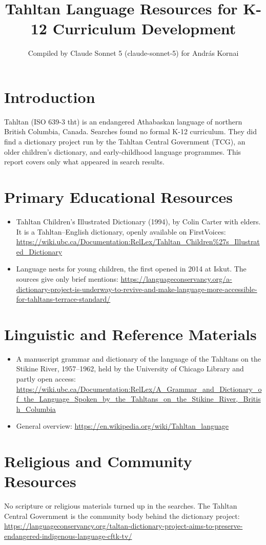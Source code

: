 \documentclass[12pt]{article}
\title{Tahltan Language Resources for K-12 Curriculum Development}
\author{Compiled by Claude Sonnet 5 (claude-sonnet-5) for Andr\'as Kornai}
\date{}
\begin{document}
\maketitle

\section{Introduction}
Tahltan (ISO 639-3 tht) is an endangered Athabaskan language of northern British Columbia, Canada. Searches found no formal K-12 curriculum. They did find a dictionary project run by the Tahltan Central Government (TCG), an older children's dictionary, and early-childhood language programmes. This report covers only what appeared in search results.

\section{Primary Educational Resources}
\begin{itemize}
\item Tahltan Children's Illustrated Dictionary (1994), by Colin Carter with elders. It is a Tahltan--English dictionary, openly available on FirstVoices: \url{https://wiki.ubc.ca/Documentation:RelLex/Tahltan_Children%27s_Illustrated_Dictionary}
\item Language nests for young children, the first opened in 2014 at Iskut. The sources give only brief mentions: \url{https://languageconservancy.org/a-dictionary-project-is-underway-to-revive-and-make-language-more-accessible-for-tahltans-terrace-standard/}
\end{itemize}

\section{Linguistic and Reference Materials}
\begin{itemize}
\item A manuscript grammar and dictionary of the language of the Tahltans on the Stikine River, 1957--1962, held by the University of Chicago Library and partly open access: \url{https://wiki.ubc.ca/Documentation:RelLex/A_Grammar_and_Dictionary_of_the_Language_Spoken_by_the_Tahltans_on_the_Stikine_River,_British_Columbia}
\item General overview: \url{https://en.wikipedia.org/wiki/Tahltan_language}
\end{itemize}

\section{Religious and Community Resources}
No scripture or religious materials turned up in the searches. The Tahltan Central Government is the community body behind the dictionary project: \url{https://languageconservancy.org/taltan-dictionary-project-aims-to-preserve-endangered-indigenous-language-cftk-tv/}
\end{document}
